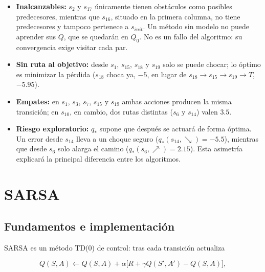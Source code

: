 \documentclass[11pt,a4paper]{article}
\newcommand{\UR}{{\nearrow}}
\newcommand{\DR}{{\searrow}}
\begin{document}
\begin{itemize}\itemsep0pt

\item \textbf{Inalcanzables:} $s_2$ y $s_{17}$ únicamente tienen obstáculos como posibles predecesores, mientras que $s_{16}$, situado en la primera columna, no tiene predecesores y tampoco pertenece a $s_{init}$. Un método sin modelo no puede aprender sus $Q$, que se quedarán en $Q_0$. No es un fallo del algoritmo: su convergencia exige visitar cada par.

\item \textbf{Sin ruta al objetivo:} desde $s_1$, $s_{15}$, $s_{18}$ y $s_{19}$ solo se puede chocar; lo óptimo es minimizar la pérdida ($s_{18}$ choca ya, $-5$, en lugar de $s_{18}\to s_{15}\to s_{19}\to T$, $-5.95$).

\item \textbf{Empates:} en $s_1$, $s_3$, $s_7$, $s_{15}$ y $s_{19}$ ambas acciones producen la misma transición; en $s_{10}$, en cambio, dos rutas distintas ($s_6$ y $s_{14}$) valen $3.5$.

\item \textbf{Riesgo exploratorio:} $q_*$ supone que después se actuará de forma óptima. Un error desde $s_{14}$ lleva a un choque seguro ($q_*(s_{14},\DR)=-5.5$), mientras que desde $s_6$ solo alarga el camino ($q_*(s_6,\UR)=2.15$). Esta asimetría explicará la principal diferencia entre los algoritmos.

\end{itemize}




\newpage

\section{SARSA}

\subsection{Fundamentos e implementación}



SARSA es un método TD(0) de control: tras cada transición actualiza

\begin{equation}
Q(S,A)\leftarrow Q(S,A)+\alpha\big[R+\gamma Q(S',A')-Q(S,A)\big],
\end{equation}
\end{document}
